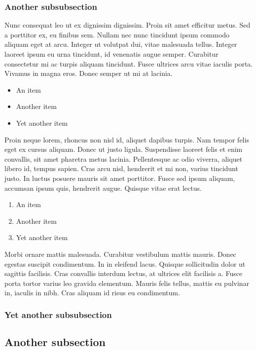 \documentclass{abe}
\begin{document}
\subsubsection{Another subsubsection}
Nunc consequat leo ut ex dignissim dignissim. Proin sit amet efficitur metus. Sed a porttitor ex, eu finibus sem. Nullam nec nunc tincidunt ipsum commodo aliquam eget at arcu. Integer ut volutpat dui, vitae malesuada tellus. Integer laoreet ipsum eu urna tincidunt, id venenatis augue semper. Curabitur consectetur mi ac turpis aliquam tincidunt. Fusce ultrices arcu vitae iaculis porta. Vivamus in magna eros. Donec semper ut mi at lacinia.

\begin{itemize}
\item An item
\item Another item
\item Yet another item
\end{itemize}

Proin neque lorem, rhoncus non nisl id, aliquet dapibus turpis. Nam tempor felis eget ex cursus aliquam. Donec ut justo ligula. Suspendisse laoreet felis et enim convallis, sit amet pharetra metus lacinia. Pellentesque ac odio viverra, aliquet libero id, tempus sapien. Cras arcu nisl, hendrerit et mi non, varius tincidunt justo. In luctus posuere mauris sit amet porttitor. Fusce sed ipsum aliquam, accumsan ipsum quis, hendrerit augue. Quisque vitae erat lectus.

\begin{enumerate}
\item An item
\item Another item
\item Yet another item
\end{enumerate}

Morbi ornare mattis malesuada. Curabitur vestibulum mattis mauris. Donec egestas suscipit condimentum. In in eleifend lacus. Quisque sollicitudin dolor ut sagittis facilisis. Cras convallis interdum lectus, at ultrices elit facilisis a. Fusce porta tortor varius leo gravida elementum. Mauris felis tellus, mattis eu pulvinar in, iaculis in nibh. Cras aliquam id risus eu condimentum.

\subsubsection{Yet another subsubsection}
\subsection{Another subsection}
\end{document}

